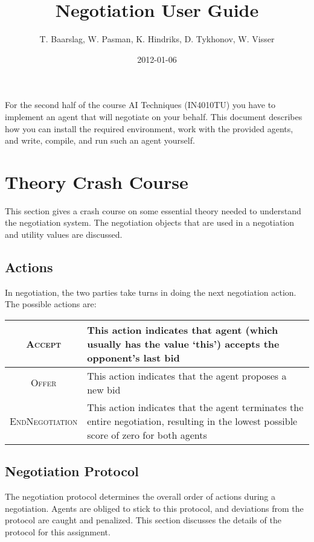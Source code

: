 \documentclass[]{article}
\title{Negotiation User Guide}
\author{T. Baarslag, W. Pasman, K. Hindriks, D. Tykhonov, W. Visser}
\date{2012-01-06}
\begin{document}
\ifpdf
{}
\else
{}
\fi

\maketitle

\newcommand\Genius{{\sc Genius}}

For the second half of the course AI Techniques (IN4010TU) you have to implement an agent that will negotiate on your behalf. This document describes how you can install the required environment, work with the provided agents, and write, compile, and run such an agent yourself.

\tableofcontents

\section{Theory Crash Course}
This section gives a crash course on some essential theory needed to understand the negotiation system. The negotiation objects that are used in a negotiation and utility values are discussed. 

\subsection{Actions}
In negotiation, the two parties take turns in doing the next negotiation action. The possible actions are:

\begin{center}
\begin{tabular}{cm{}}
\hline
\textsc{Accept} & This action indicates that agent (which usually has the value `this') accepts the opponent's last bid\\
\hline
\textsc{Offer} & This action indicates that the agent proposes a new bid\\
\hline
\textsc{EndNegotiation} & This action indicates that the agent terminates the entire negotiation, resulting in the lowest possible score of zero for both agents\\
\hline
\end{tabular}
\end{center}

\subsection{Negotiation Protocol}
The negotiation protocol determines the overall order of actions during a negotiation. Agents are obliged to stick to this protocol, and deviations from the protocol are caught and penalized. This section discusses the details of the protocol for this assignment.
\end{document}
